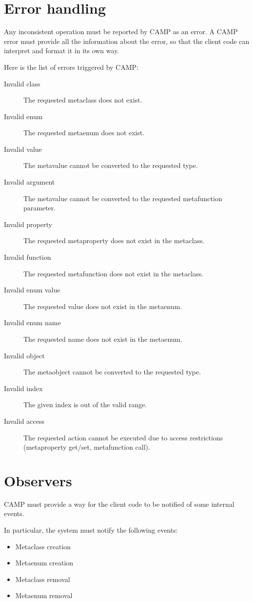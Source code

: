 \documentclass[a4paper, twoside]{report}
\begin{document}
\section{Error handling}
\label{sec:error}

	Any inconsistent operation must be reported by CAMP as an error. A CAMP error must provide
	all the information about the error, so that the client code can interpret and format it
	in its own way.

	Here is the list of errors triggered by CAMP:

	\begin{description}
		\item[Invalid class] The requested metaclass does not exist.
		\item[Invalid enum] The requested metaenum does not exist.
		\item[Invalid value] The metavalue cannot be converted to the requested type.
		\item[Invalid argument] The metavalue cannot be converted to the requested metafunction parameter.
		\item[Invalid property] The requested metaproperty does not exist in the metaclass.
		\item[Invalid function] The requested metafunction does not exist in the metaclass.
		\item[Invalid enum value] The requested value does not exist in the metaenum.
		\item[Invalid enum name] The requested name does not exist in the metaenum.
		\item[Invalid object] The metaobject cannot be converted to the requested type.
		\item[Invalid index] The given index is out of the valid range.
		\item[Invalid access] The requested action cannot be executed due to access restrictions (metaproperty get/set, metafunction call).
	\end{description}

\section{Observers}
\label{sec:observer}

	CAMP must provide a way for the client code to be notified of some internal events.
	
	In particular, the system must notify the following events:
	
	\begin{itemize}
		\item Metaclass creation
		\item Metaenum creation
		\item Metaclass removal
		\item Metaenum removal
	\end{itemize}
\end{document}
